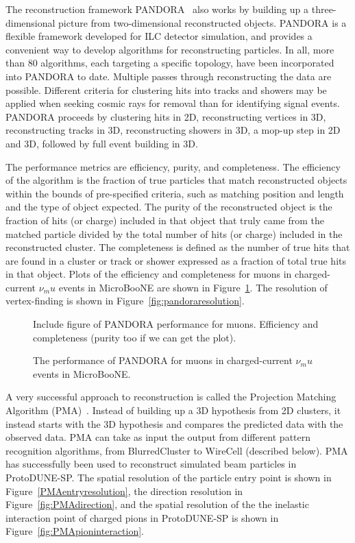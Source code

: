 The reconstruction framework PANDORA~\cite{pandora} also works by
building up a three-dimensional picture from two-dimensional
reconstructed objects.  PANDORA is a flexible framework developed for
ILC detector simulation, and provides a convenient way to develop
algorithms for reconstructing particles.  In all, more than 80
algorithms, each targeting a specific topology, have been incorporated
into PANDORA to date.  Multiple passes through reconstructing the data
are possible.  Different criteria for clustering hits into tracks and
showers may be applied when seeking cosmic rays for removal than for
identifying signal events.  PANDORA proceeds by clustering hits in 2D,
reconstructing vertices in 3D, reconstructing tracks in 3D,
reconstructing showers in 3D, a mop-up step in 2D and 3D, followed by
full event building in 3D.

The performance metrics are efficiency, purity, and completeness.  The
efficiency of the algorithm is the fraction of true particles that
match reconstructed objects within the bounds of pre-specified
criteria, such as matching position and length and the type of object
expected.  The purity of the reconstructed object is the fraction of
hits (or charge) included in that object that truly came from the
matched particle divided by the total number of hits (or charge)
included in the reconstructed cluster.  The completeness is defined as
the number of true hits that are found in a cluster or track or shower
expressed as a fraction of total true hits in that object.  Plots of
the efficiency and completeness for muons in charged-current $\nu_mu$
events in MicroBooNE are shown in Figure~\ref{fig:muonpandoraperf}.
The resolution of vertex-finding is shown in
Figure~\ref{fig:pandoraresolution}.

\begin{figure}[htb]
\centering
Include figure of PANDORA performance for muons.  Efficiency and
completeness (purity too if we can get the plot).
\caption{The performance of PANDORA for muons in charged-current
  $\nu_mu$ events in MicroBooNE.  }
\label{fig:muonpandoraperf}
\end{figure}

A very successful approach to reconstruction is called the Projection
Matching Algorithm (PMA)~\cite{pma_algorithm}.  Instead of building up
a 3D hypothesis from 2D clusters, it instead starts with the 3D
hypothesis and compares the predicted data with the observed data.
PMA can take as input the output from different pattern recognition
algorithms, from BlurredCluster to WireCell (described below).  PMA
has successfully been used to reconstruct simulated beam particles in
ProtoDUNE-SP.  The spatial resolution of the particle entry point is
shown in Figure~\ref{PMAentryresolution}, the direction resolution in
Figure~\ref{fig:PMAdirection}, and the spatial resolution of the the
inelastic interaction point of charged pions in ProtoDUNE-SP is shown
in Figure~\ref{fig:PMApioninteraction}.


